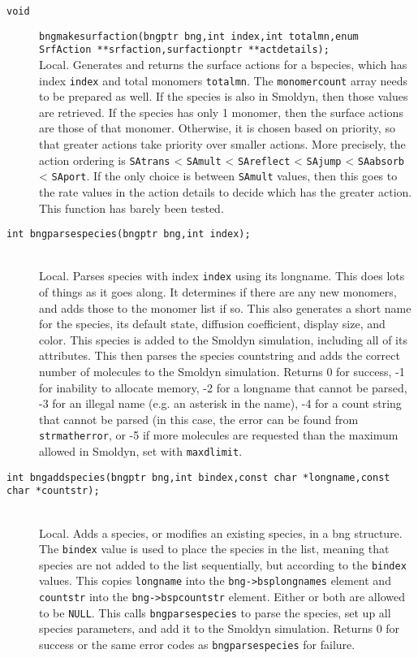 \documentclass {book}
\newcommand {\ttt} {\texttt}
\begin{document}
\begin{description}
\item[\ttt{void}]
\ttt{bngmakesurfaction(bngptr bng,int index,int totalmn,enum SrfAction **srfaction,surfactionptr **actdetails);}
\hfill \\
Local. Generates and returns the surface actions for a bspecies, which has index \ttt{index} and total monomers \ttt{totalmn}. The \ttt{monomercount} array needs to be prepared as well. If the species is also in Smoldyn, then those values are retrieved. If the species has only 1 monomer, then the surface actions are those of that monomer. Otherwise, it is chosen based on priority, so that greater actions take priority over smaller actions. More precisely, the action ordering is \ttt{SAtrans} < \ttt{SAmult} < \ttt{SAreflect} < \ttt{SAjump} < \ttt{SAabsorb} < \ttt{SAport}. If the only choice is between \ttt{SAmult} values, then this goes to the rate values in the action details to decide which has the greater action. This function has barely been tested.

\item[\ttt{int bngparsespecies(bngptr bng,int index);}]
\hfill \\
Local. Parses species with index \ttt{index} using its longname. This does lots of things as it goes along. It determines if there are any new monomers, and adds those to the monomer list if so. This also generates a short name for the species, its default state, diffusion coefficient, display size, and color. This species is added to the Smoldyn simulation, including all of its attributes. This then parses the species countstring and adds the correct number of molecules to the Smoldyn simulation. Returns 0 for success, -1 for inability to allocate memory, -2 for a longname that cannot be parsed, -3 for an illegal name (e.g. an asterisk in the name), -4 for a count string that cannot be parsed (in this case, the error can be found from \ttt{strmatherror}, or -5 if more molecules are requested than the maximum allowed in Smoldyn, set with \ttt{maxdlimit}.

\item[\ttt{int bngaddspecies(bngptr bng,int bindex,const char *longname,const char *countstr);}]
\hfill \\
Local. Adds a species, or modifies an existing species, in a bng structure. The \ttt{bindex} value is used to place the species in the list, meaning that species are not added to the list sequentially, but according to the \ttt{bindex} values. This copies \ttt{longname} into the \ttt{bng->bsplongnames} element and \ttt{countstr} into the \ttt{bng->bspcountstr} element. Either or both are allowed to be \ttt{NULL}. This calls \ttt{bngparsespecies} to parse the species, set up all species parameters, and add it to the Smoldyn simulation. Returns 0 for success or the same error codes as \ttt{bngparsespecies} for failure.


\end{description}
\end{document}
